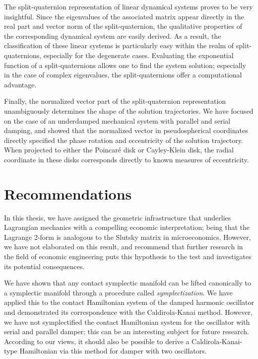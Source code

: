 The split-quaternion representation of linear dynamical systems proves to be very insightful. Since the eigenvalues of the associated matrix appear directly in the real part and vector norm of the split-quaternion, the qualitative properties of the corresponding dynamical system are easily derived. As a result, the classification of these linear systems is particularly easy within the realm of split-quaternions, especially for the degenerate cases. Evaluating the exponential function of a split-quaternions allows one to find the system solution; especially in the case of complex eigenvalues, the split-quaternions offer a computational advantage.

Finally, the normalized vector part of the split-quaternion representation unambiguously determines the shape of the solution trajectories. We have focused on the case of an underdamped mechanical system with parallel and serial damping, and showed that the normalized vector in pseudospherical coordinates directly specified the phase rotation and eccentricity of the solution trajectory. When projected to either the Poincaré disk or Cayley-Klein disk, the radial coordinate in these disks corresponds directly to known measures of eccentricity.

\section*{Recommendations}
In this thesis, we have assigned the geometric infrastructure that underlies Lagrangian mechanics with a compelling economic interpretation; being that the Lagrange 2-form is analogous to the Slutsky matrix in microeconomics. However, we have not elaborated on this result, and recommend that further research in the field of economic engineering puts this hypothesis to the test and investigates its potential consequences.

We have shown that any contact symplectic manifold can be lifted canonically to a symplectic manifold through a procedure called \emph{symplectization}. We have applied this to the contact Hamiltonian system of the damped harmonic oscillator and demonstrated its correspondence with the Caldirola-Kanai method. However, we have not symplectified the contact Hamiltonian system for the oscillator with serial and parallel damper; this can be an interesting subject for future research. According to our views, it should also be possible to derive a Caldirola-Kanai-type Hamiltonian via this method for damper with two oscillators.

